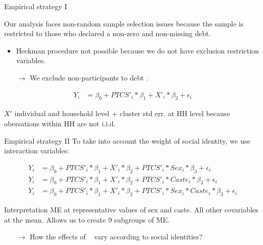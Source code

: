 \documentclass[aspectratio=169]{beamer}
\begin{document}
\begin{frame}{Empirical strategy I}
\label{frame:empirical1}

\begin{brickbox}
Our analysis faces non-random sample selection issues because the sample is restricted to those who declared a non-zero and non-missing debt.
\begin{itemize}
\item Heckman procedure not possible because we do not have exclusion restriction variables.
\item[$\rightarrow$] We exclude non-participants to debt \citep{Rio2006}.
\end{itemize}
\end{brickbox}

\begin{align}
\label{eq:reg1} Y_{i} & = \beta_{0}+PTCS'_{i}*\beta_{1}+X'_{i}*\beta_{2}+\epsilon_i
\end{align}

$X'$ individual and household level \hyperlink{frame:control}{} + cluster std err. at HH level because obersations within HH are not i.i.d.

\end{frame}






\begin{frame}{Empirical strategy II}
To take into account the weight of social identity, we use interaction variables:

\begin{align}
\label{eq:reg2} Y_{i} & = \beta_{0}+PTCS'_{i}*\beta_{1}+X'_{i}*\beta_{2}+PTCS'_{i}*Sex_{i}*\beta_{3}+\epsilon_i  \\ 
\label{eq:reg3} Y_{i} & = \beta_{0}+PTCS'_{i}*\beta_{1}+X'_{i}*\beta_{2}+PTCS'_{i}*Caste_{i}*\beta_{3}+\epsilon_i  \\ 
\label{eq:reg4} Y_{i} & = \beta_{0}+PTCS'_{i}*\beta_{1}+X'_{i}*\beta_{2}+PTCS'_{i}*Sex_{i}*Caste_{i}*\beta_{3}+\epsilon_i 
\end{align}

\begin{greenbox}{Interpretation \citep{Buis2010}}
ME at representative values of sex and caste.
All other covariables at the mean. 
Allows us to create 9 subgroups of ME. 
\begin{itemize}
\item[$\rightarrow$] How the effects of \PTCS~ vary according to social identities?
\end{itemize}
\end{greenbox}

\end{frame}
\end{document}
